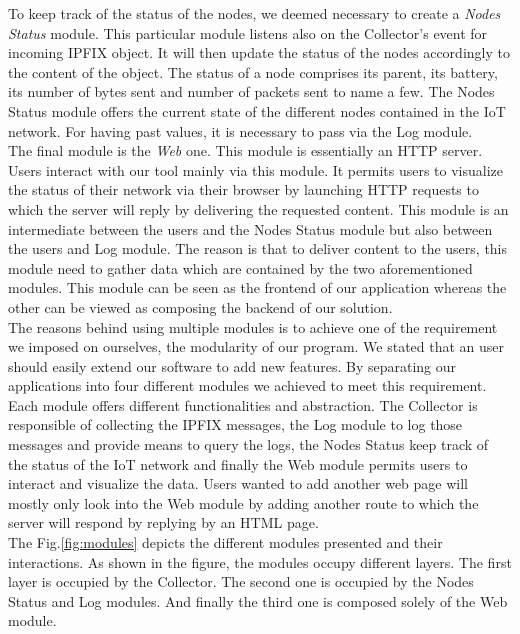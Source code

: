 To keep track of the status of the nodes, we deemed necessary to create a \textit{Nodes Status} module. This particular module listens also on the Collector's event for incoming IPFIX object. It will then update the status of the nodes accordingly to the content of the object. The status of a node comprises its parent, its battery, its number of bytes sent and number of packets sent to name a few. The Nodes Status module offers the current state of the different nodes contained in the IoT network. For having past values, it is necessary to pass via the Log module. \\

The final module is the \textit{Web} one. This module is essentially an HTTP server. Users interact with our tool mainly via this module. It permits users to visualize the status of their network via their browser by launching HTTP requests to which the server will reply by delivering the requested content. This module is an intermediate between the users and the Nodes Status module but also between the users and Log module. The reason is that to deliver content to the users, this module need to gather data which are contained by the two aforementioned modules. This module can be seen as the frontend of our application whereas the other can be viewed as composing the backend of our solution.\\

The reasons behind using multiple modules is to achieve one of the requirement we imposed on ourselves, the modularity of our program. We stated that an user should easily extend our software to add new features. By separating our applications into four different modules we achieved to meet this requirement. Each module offers different functionalities and abstraction. The Collector is responsible of collecting the IPFIX messages, the Log module to log those messages and provide means to query the logs, the Nodes Status keep track of the status of the IoT network and finally the Web module permits users to interact and visualize the data. Users wanted to add another web page will mostly only look into the Web module by adding another route to which the server will respond by replying by an HTML page. \\

The Fig.\ref{fig:modules} depicts the different modules presented and their interactions. As shown in the figure, the modules occupy different layers. The first layer is occupied by the Collector. The second one is occupied by the Nodes Status and Log modules. And finally the third one is composed solely of the Web module.

